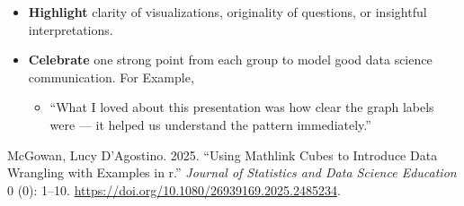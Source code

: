 \documentclass[
]{article}
\providecommand{\tightlist}{%
  \setlength{\itemsep}{0pt}\setlength{\parskip}{0pt}}\usepackage{longtable,booktabs,array}
\newlength{\cslhangindent}
\newenvironment{CSLReferences}[2] %
 {\begin{list}{}{%
  \setlength{\itemindent}{0pt}
  \setlength{\leftmargin}{0pt}
  \setlength{\parsep}{0pt}
  \ifodd #1
   \setlength{\leftmargin}{\cslhangindent}
   \setlength{\itemindent}{-1\cslhangindent}
  \fi
  \setlength{\itemsep}{#2\baselineskip}}}
 {\end{list}}
\begin{document}
\begin{itemize}
\item
  \textbf{Highlight} clarity of visualizations, originality of
  questions, or insightful interpretations.
\item
  \textbf{Celebrate} one strong point from each group to model good data
  science communication. For Example,

  \begin{itemize}
  \tightlist
  \item
    ``What I loved about this presentation was how clear the graph
    labels were --- it helped us understand the pattern immediately.''
  \end{itemize}
\end{itemize}

\label{refs}
\begin{CSLReferences}{1}{0}
McGowan, Lucy D'Agostino. 2025. {``Using Mathlink Cubes to Introduce
Data Wrangling with Examples in r.''} \emph{Journal of Statistics and
Data Science Education} 0 (0): 1--10.
\url{https://doi.org/10.1080/26939169.2025.2485234}.

\end{CSLReferences}
\end{document}
